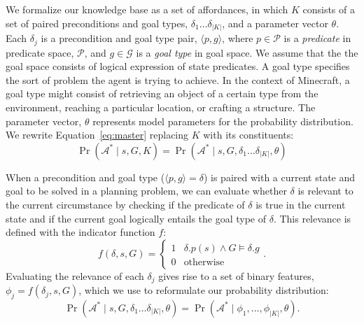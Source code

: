 \documentclass[conference]{IEEEtran}
\newcommand{\dnote}[1]{\textcolor{Green}{\textbf{}}}
\newcommand{\jnote}[1]{\textcolor{Orange}{\textbf{}}}
\begin{document}
We formalize our knowledge base as a set of affordances, in which $K$
consists of a set of paired preconditions and goal types, $\delta_1
\ldots \delta_{|K|}$, and a parameter vector $\theta$.  Each
$\delta_j$ is a precondition and goal type pair, $\langle p, g
\rangle$, where $p \in \mathcal{P}$ is a {\it predicate} in predicate space, 
$\mathcal{P}$, and $g \in \mathcal{G}$ is a {\it goal type} in goal space. 
We assume that the the goal space consists of logical expression of state predicates.
A goal type specifies the sort of problem the agent is trying to achieve. In the context of Minecraft,
a goal type might consist of retrieving an object of a certain type from the environment, reaching a particular location, or crafting a structure. \jnote{Somewhere, maybe here? we should give an example of goals and goal types.
I think it's kind of ambiguous what we mean.} \dnote{how about this?}
The parameter vector, $\theta$ represents model parameters for the probability distribution.
We rewrite Equation~\ref{eq:master} replacing $K$ with its constituents:
\begin{equation}
\Pr(\mathcal{A}^* \mid s, G, K) = \Pr(\mathcal{A}^* \mid s, G, \delta_1 \ldots \delta_{|K|}, \theta)
\end{equation}

When a precondition and goal type ($\langle p , g \rangle = \delta$) is paired with a current state and goal to be solved in a planning problem, we can evaluate whether $\delta$ is relevant to the current circumstance by checking if the predicate of $\delta$ is true in the current state and if the current goal logically entails the goal type of $\delta$. This relevance is defined with the indicator function $f$:
\begin{equation}
f(\delta, s, G) = 
\begin{cases}
1& \delta.p(s) \wedge G \models \delta.g \\
0& \text{otherwise}
\end{cases}.
\label{eq:f_func_def}
\end{equation}
Evaluating the relevance of each $\delta_j$ gives rise to a set of binary features, $\phi_j = f(\delta_j, s, G)$, which we use to reformulate our probability distribution:
\begin{equation}
\Pr(\mathcal{A}^* \mid s, G, \delta_1 \ldots \delta_{|K|}, \theta) = \Pr(\mathcal{A}^* \mid \phi_1, \ldots, \phi_{|K|}, \theta).
\label{eq:feature_rep}
\end{equation}
\end{document}
